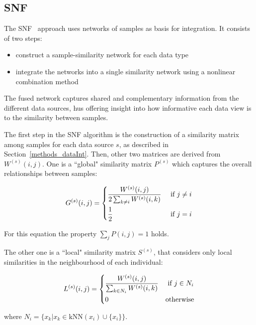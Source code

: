 \subsection{SNF} \label{dataInt_SNF}
The SNF~\cite{wang2014similarity} approach uses networks of samples as basis for integration. It consists of two steps:
\begin{itemize}
    \item construct a sample-similarity network for each data type
    \item integrate the networks into a single similarity network using a nonlinear combination method
\end{itemize}
The fused network captures shared and complementary information from the different data sources, hus offering insight into how informative each data view is to the similarity between samples.

The first step in the SNF algorithm is the construction of a similarity matrix among samples for each data source $s$, as described in Section~\ref{methods_dataInt}. Then, other two matrices are derived from $W^{(s)}(i,j)$. One is a ``global" similarity matrix $P^{(s)}$ which captures the overall relationships between samples:

\begin{equation*}
    G^{(s)}(i,j) = 
    \begin{dcases}
        \frac{W^{(s)}(i,j)}{2 \sum_{k \neq i} W^{(s)}(i,k)} & \text{ if $j \neq i$}\\
        \frac{1}{2} & \text{ if $j = i$}\\
    \end{dcases}       
\end{equation*}


For this equation the property $\sum_{j} P(i,j)=1$ holds.

The other one is a ``local" similarity matrix $S^{(s)}$, that considers only local similarities in the neighbourhood of each individual:

\begin{equation*}
    L^{(s)}(i,j) = 
    \begin{dcases}
      \frac{W^{(s)}(i,j)}{\sum_{k \in N_i} W^{(s)}(i,k)} & \text{ if $j \in N_i$}\\
      0 & \text{otherwise}\\
    \end{dcases}       
\end{equation*}

where $N_i = \{ x_k | x_k \in \text{kNN}(x_i) \cup \{ x_i \}\}$. \newline


